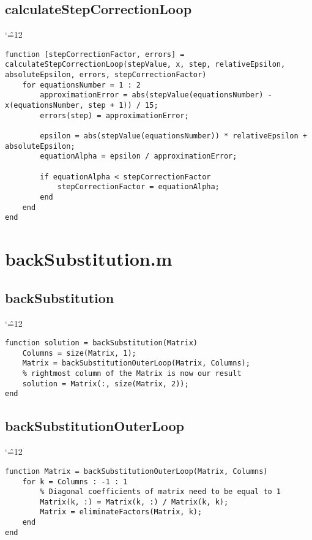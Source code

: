 \documentclass[12pt]{report}
\newenvironment{simplechar}{%
   \catcode`\^=12
}{}
\begin{document}
\subsection{calculateStepCorrectionLoop}
\begin{simplechar}
\begin{lstlisting}
function [stepCorrectionFactor, errors] = calculateStepCorrectionLoop(stepValue, x, step, relativeEpsilon, absoluteEpsilon, errors, stepCorrectionFactor)
    for equationsNumber = 1 : 2
        approximationError = abs(stepValue(equationsNumber) - x(equationsNumber, step + 1)) / 15;
        errors(step) = approximationError;

        epsilon = abs(stepValue(equationsNumber)) * relativeEpsilon + absoluteEpsilon;
        equationAlpha = epsilon / approximationError;

        if equationAlpha < stepCorrectionFactor
            stepCorrectionFactor = equationAlpha;
        end
    end
end
\end{lstlisting}
\end{simplechar}

\section{backSubstitution.m}
\subsection{backSubstitution}
\begin{simplechar}
\begin{lstlisting}
function solution = backSubstitution(Matrix)
    Columns = size(Matrix, 1);
    Matrix = backSubstitutionOuterLoop(Matrix, Columns);
    % rightmost column of the Matrix is now our result
    solution = Matrix(:, size(Matrix, 2));
end
\end{lstlisting}
\end{simplechar}

\subsection{backSubstitutionOuterLoop}
\begin{simplechar}
\begin{lstlisting}
function Matrix = backSubstitutionOuterLoop(Matrix, Columns)
    for k = Columns : -1 : 1
        % Diagonal coefficients of matrix need to be equal to 1
        Matrix(k, :) = Matrix(k, :) / Matrix(k, k);
        Matrix = eliminateFactors(Matrix, k);
    end
end
\end{lstlisting}
\end{simplechar}
\end{document}
